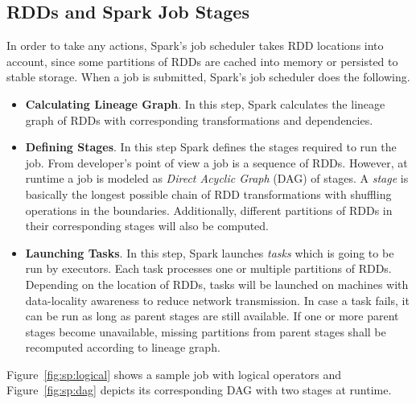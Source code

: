 \subsection{RDDs and Spark Job Stages}
\label{sp:stage}
In order to take any actions, Spark's job scheduler takes RDD locations into account, since some partitions of RDDs are cached into memory or persisted to stable storage. When a job is submitted, Spark's job scheduler does the following.
\begin{itemize}
    \item \textbf{Calculating Lineage Graph}. In this step, Spark calculates the lineage graph of RDDs with corresponding transformations and dependencies.
    \item \textbf{Defining Stages}. In this step Spark defines the stages required to run the job. From developer's point of view a job is a sequence of RDDs. However, at runtime a job is modeled as \emph{Direct Acyclic Graph} (DAG) of stages. A \emph{stage} is basically the longest possible chain of RDD transformations with shuffling operations in the boundaries. Additionally, different partitions of RDDs in their corresponding stages will also be computed. 
    \item \textbf{Launching Tasks}. In this step, Spark launches \emph{tasks} which is going to be run by executors. Each task processes one or multiple partitions of RDDs. Depending on the location of RDDs, tasks will be launched on machines with data-locality awareness to reduce network transmission. In case a task fails, it can be run as long as parent stages are still available. If one or more parent stages become unavailable, missing partitions from parent stages shall be recomputed according to lineage graph.
\end{itemize}
Figure~\ref{fig:sp:logical} shows a sample job with logical operators and Figure~\ref{fig:sp:dag} depicts its corresponding DAG with two stages at runtime.

